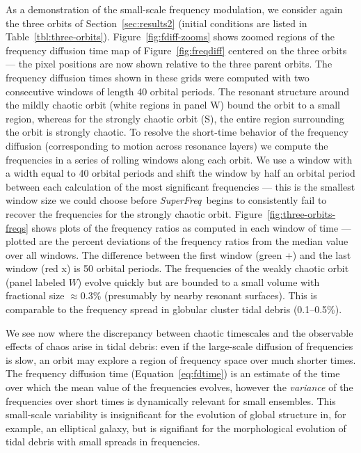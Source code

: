 \documentclass[letterpaper,12pt,preprint]{aastex}
\newcommand{\project}[1]{\textsl{#1}}
\newcommand{\superfreq}{\project{SuperFreq}}
\begin{document}
As a demonstration of the small-scale frequency modulation, we consider again the three orbits of Section~\ref{sec:results2} (initial conditions are listed in Table~\ref{tbl:three-orbits}). Figure~\ref{fig:fdiff-zooms} shows zoomed regions of the frequency diffusion time map of Figure~\ref{fig:freqdiff} centered on the three orbits --- the pixel positions are now shown relative to the three parent orbits. The frequency diffusion times shown in these grids were computed with two consecutive windows of length 40 orbital periods. The resonant structure around the mildly chaotic orbit (white regions in panel W) bound the orbit to a small region, whereas for the strongly chaotic orbit (S), the entire region surrounding the orbit is strongly chaotic. To resolve the short-time behavior of the frequency diffusion (corresponding to motion across resonance layers) we compute the frequencies in a series of rolling windows along each orbit. We use a window with a width equal to 40 orbital periods and shift the window by half an orbital period between each calculation of the most significant frequencies --- this is the smallest window size we could choose before \superfreq\ begins to consistently fail to recover the frequencies for the strongly chaotic orbit.  Figure~\ref{fig:three-orbits-freqs} shows plots of the frequency ratios as computed in each window of time --- plotted are the percent deviations of the frequency ratios from the median value over all windows. The difference between the first window (green +) and the last window (red x) is 50 orbital periods. The frequencies of the weakly chaotic orbit (panel labeled $W$) evolve quickly but are bounded to a small volume with fractional size $\approx$0.3\% (presumably by nearby resonant surfaces). This is comparable to the frequency spread in globular cluster tidal debris (0.1--0.5\%).

We see now where the discrepancy between chaotic timescales and the observable effects of chaos arise in tidal debris: even if the large-scale diffusion of frequencies is slow, an orbit may explore a  region of frequency space over much shorter times. The frequency diffusion time (Equation~\ref{eq:fdtime}) is an estimate of the time over which the mean value of the frequencies evolves, however the \emph{variance} of the frequencies over short times is dynamically relevant for small ensembles. This small-scale variability is insignificant for the evolution of global structure in, for example, an elliptical galaxy, but is signifiant for the morphological evolution of tidal debris with small spreads in frequencies. 
\end{document}
